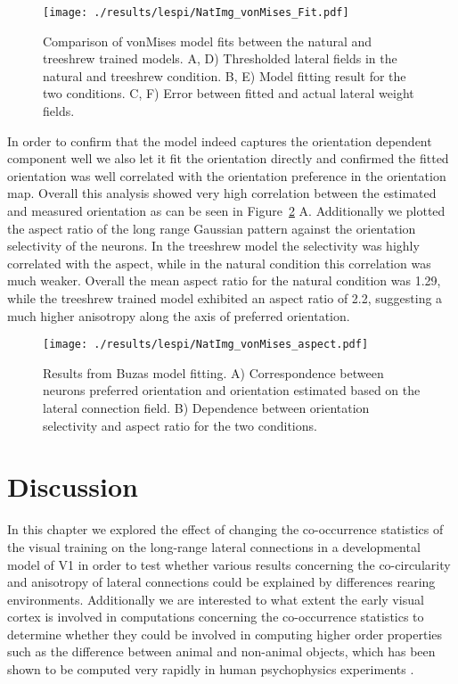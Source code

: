 \begin{figure}
	\centering
        \texttt{[image: ./results/lespi/NatImg\_vonMises\_Fit.pdf]}
	\caption[Comparison of \cite{Buzas2006} vonMises model fit between
      the natural and treeshrew trained models.]{Comparison of
      \cite{Buzas2006} vonMises model fits between the natural and
      treeshrew trained models. A, D) Thresholded lateral fields in
      the natural and treeshrew condition. B, E) Model fitting result
      for the two conditions. C, F) Error between fitted and actual
      lateral weight fields.}
	\label{NatImgvonMises}
\end{figure}

In order to confirm that the model indeed captures the orientation
dependent component well we also let it fit the orientation directly
and confirmed the fitted orientation was well correlated with the
orientation preference in the orientation map. Overall this analysis
showed very high correlation between the estimated and measured
orientation as can be seen in Figure~\ref{NatImgvonMisesAspect}
A. Additionally we plotted the aspect ratio of the long range Gaussian
pattern against the orientation selectivity of the neurons. In the
treeshrew model the selectivity was highly correlated with the aspect,
while in the natural condition this correlation was much
weaker. Overall the mean aspect ratio for the natural condition was
1.29, while the treeshrew trained model exhibited an aspect ratio of
2.2, suggesting a much higher anisotropy along the axis of preferred
orientation.

\begin{figure}
	\centering
        \texttt{[image: ./results/lespi/NatImg\_vonMises\_aspect.pdf]}
	\caption[Results from Buzas model fitting.]{Results from Buzas
      model fitting. A) Correspondence between neurons preferred
      orientation and orientation estimated based on the lateral
      connection field. B) Dependence between orientation selectivity
      and aspect ratio for the two conditions.}
	\label{NatImgvonMisesAspect}
\end{figure}

\section{Discussion}

In this chapter we explored the effect of changing the co-occurrence
statistics of the visual training on the long-range lateral
connections in a developmental model of V1 in order to test whether
various results concerning the co-circularity \citep{Hunt2011} and
anisotropy of lateral connections \citep{Bosking1997} could be
explained by differences rearing environments. Additionally we are
interested to what extent the early visual cortex is involved in
computations concerning the co-occurrence statistics to determine
whether they could be involved in computing higher order properties
such as the difference between animal and non-animal objects, which
has been shown to be computed very rapidly in human psychophysics
experiments \citep{Serre2007b}.

